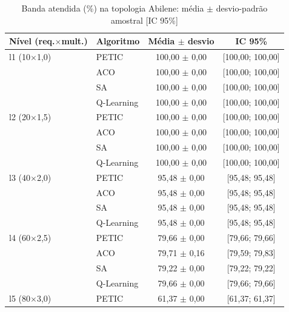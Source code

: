 \begin{table}[htb]
    \centering
    \small
    \caption{Banda atendida (\%) na topologia Abilene: média $\pm$ desvio-padrão amostral [IC 95\%]}
    \label{tab:banda-abilene}
    \begin{tabular}{llcc}
        \hline
        Nível (req.$\times$mult.) & Algoritmo & Média $\pm$ desvio & IC 95\% \\
        \hline
        l1 (10$\times$1,0) & PETIC & 100,00 $\pm$ 0,00 & [100,00; 100,00] \\
         & ACO & 100,00 $\pm$ 0,00 & [100,00; 100,00] \\
         & SA & 100,00 $\pm$ 0,00 & [100,00; 100,00] \\
         & Q-Learning & 100,00 $\pm$ 0,00 & [100,00; 100,00] \\
        \hline
        l2 (20$\times$1,5) & PETIC & 100,00 $\pm$ 0,00 & [100,00; 100,00] \\
         & ACO & 100,00 $\pm$ 0,00 & [100,00; 100,00] \\
         & SA & 100,00 $\pm$ 0,00 & [100,00; 100,00] \\
         & Q-Learning & 100,00 $\pm$ 0,00 & [100,00; 100,00] \\
        \hline
        l3 (40$\times$2,0) & PETIC & 95,48 $\pm$ 0,00 & [95,48; 95,48] \\
         & ACO & 95,48 $\pm$ 0,00 & [95,48; 95,48] \\
         & SA & 95,48 $\pm$ 0,00 & [95,48; 95,48] \\
         & Q-Learning & 95,48 $\pm$ 0,00 & [95,48; 95,48] \\
        \hline
        l4 (60$\times$2,5) & PETIC & 79,66 $\pm$ 0,00 & [79,66; 79,66] \\
         & ACO & 79,71 $\pm$ 0,16 & [79,59; 79,83] \\
         & SA & 79,22 $\pm$ 0,00 & [79,22; 79,22] \\
         & Q-Learning & 79,66 $\pm$ 0,00 & [79,66; 79,66] \\
        \hline
        l5 (80$\times$3,0) & PETIC & 61,37 $\pm$ 0,00 & [61,37; 61,37] \\

\end{tabular}
\end{table}
